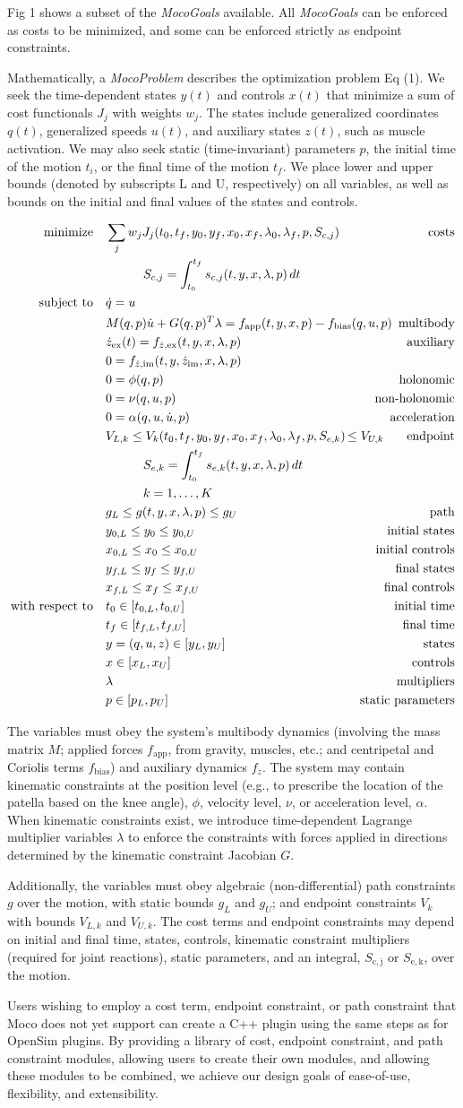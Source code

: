 \documentclass[10pt,letterpaper]{article}
\newcommand{\ocp}{
\begin{align}
    \begin{aligned}
        \mbox{minimize}
         \quad & \sum_j w_{j} J_{j}(t_0, t_f, y_0, y_f, x_{0}, x_{f}, \lambda_0, \lambda_f, p, S_{c,j}) & \textrm{costs} \\
        & \quad\quad\quad S_{c,j} = \int_{t_0}^{t_f} s_{c,j}(t, y, x, \lambda, p)\,dt  \\
        \mbox{subject to}
         \quad & \dot{q} = u \\
         & M(q, p)\dot{u} + G(q, p)^T \lambda = f_{\mathrm{app}}(t, y, x, p) - \mathrlap{f_{\mathrm{bias}}(q, u, p)}  & \textrm{multibody} \\
         & \dot{z}_\textrm{ex}(t) = f_{\dot{z},\textrm{ex}}(t, y, x, \lambda, p) & \textrm{auxiliary} \\
         & 0 = f_{\dot{z},\textrm{im}}(t, y, \dot{z}_{\textrm{im}}, x, \lambda, p) \\
         & 0 = \phi(q, p) & \textrm{holonomic} \\
         & 0 = \nu(q, u, p) & \textrm{non-holonomic} \\
         & 0 = \alpha(q, u, \dot{u}, p) & \textrm{acceleration} \\
         & V_{L,k} \leq V_k(t_0, t_f, y_0, y_f, x_{0}, x_{f}, \lambda_0, \lambda_f, p, S_{e,k}) \,\mathrlap{\leq V_{U,k}} & \textrm{endpoint} \\
         & \quad\quad\quad S_{e,k} = \int_{t_0}^{t_f} s_{e,k}(t, y, x, \lambda, p)\,dt \\
         & \quad\quad\quad k = 1, \ldots, K \\
         & g_{L} \leq g(t, y, x, \lambda, p) \leq g_{U} & \textrm{path} \\
         & y_{0,L} \leq y_0 \leq y_{0,U} & \textrm{initial states} \\
         & x_{0,L} \leq x_0 \leq x_{0,U} & \textrm{initial controls} \\
         & y_{f,L} \leq y_f \leq y_{f,U} & \textrm{final states} \\
         & x_{f,L} \leq x_f \leq x_{f,U} & \textrm{final controls} \\
         \mbox{with respect to} \quad
         & t_0 \in [t_{0,L}, t_{0,U}] & \textrm{initial time} \\
         & t_f \in [t_{f,L}, t_{f,U}] & \textrm{final time} \\
         & y = (q, u, z) \in [y_{L}, y_{U}] & \textrm{states} \\
         & x \in [x_{L}, x_{U}] & \textrm{controls} \\
         & \lambda & \textrm{multipliers} \\
         & p \in [p_{L}, p_{U}] & \textrm{static parameters}
    \end{aligned}
\end{align}
}
\begin{document}
Fig 1 shows a subset of the \textit{MocoGoals} available. All \textit{MocoGoals} can be enforced as costs to be minimized, and some can be enforced strictly as endpoint constraints.

Mathematically, a \textit{MocoProblem} describes the optimization problem Eq (1). We seek the time-dependent states $y(t)$ and controls $x(t)$ that minimize a sum of cost functionals $J_j$ with weights $w_j$. The states include generalized coordinates $q(t)$, generalized speeds $u(t)$, and auxiliary states $z(t)$, such as muscle activation. We may also seek static (time-invariant) parameters $p$, the initial time of the motion $t_i$, or the final time of the motion $t_f$. We place lower and upper bounds (denoted by subscripts L and U, respectively) on all variables, as well as bounds on the initial and final values of the states and controls.

\ocp

The variables must obey the system’s multibody dynamics (involving the mass matrix $M$; applied forces $f_\mathrm{app}$, from gravity, muscles, etc.; and centripetal and Coriolis terms $f_\mathrm{bias}$) and auxiliary dynamics $f_{\dot{z}}$. The system may contain kinematic constraints at the position level (e.g., to prescribe the location of the patella based on the knee angle), $\phi$, velocity level, $\nu$, or acceleration level, $\alpha$. When kinematic constraints exist, we introduce time-dependent Lagrange multiplier variables $\lambda$ to enforce the constraints with forces applied in directions determined by the kinematic constraint Jacobian $G$.

Additionally, the variables must obey algebraic (non-differential) path constraints $g$ over the motion, with static bounds $g_L$ and $g_U$; and endpoint constraints $V_k$ with bounds $V_{L,k}$ and $V_{U,k}$. The cost terms and endpoint constraints may depend on initial and final time, states, controls, kinematic constraint multipliers (required for joint reactions), static parameters, and an integral, $S_\mathrm{c,j}$ or $S_\mathrm{e,k}$, over the motion.

Users wishing to employ a cost term, endpoint constraint, or path constraint that Moco does not yet support can create a C++ plugin using the same steps as for OpenSim plugins. By providing a library of cost, endpoint constraint, and path constraint modules, allowing users to create their own modules, and allowing these modules to be combined, we achieve our design goals of ease-of-use, flexibility, and extensibility.
\end{document}
